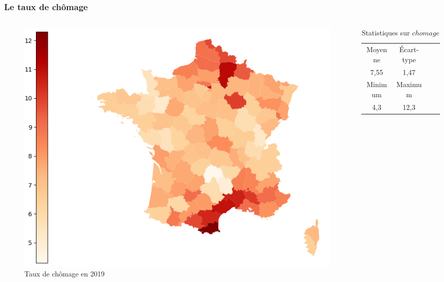 \documentclass{beamer}
\begin{document}
\begin{frame}
\frametitle{Le taux de chômage}
\begin{columns}
\begin{column}{0.5\textwidth}
    \centering
    \begin{figure}
        \includegraphics[width=\textwidth]{chomage.png}
        \caption{Taux de chômage en 2019}
    \end{figure}
\end{column}

\begin{column}{0.5\textwidth}
\begin{table}[H]
    \caption*{Statistiques sur $chomage$}
    \begin{tabular}{cccc}
    \toprule
    Moyenne  & Écart-type   \\ 
    7,55 &  1,47   \\
    \midrule
    Minimum & Maximum   \\ 
    4,3    & 12,3      \\
    \bottomrule
    \end{tabular}
\end{table}
\end{column}

\end{columns}
\end{frame}
    
\end{document}
